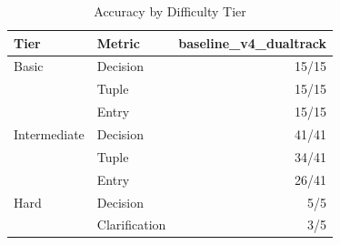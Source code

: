 \begin{table}[htbp]
\centering
\caption{Accuracy by Difficulty Tier}
\label{tab:tier-breakdown}
\begin{tabular}{ll r}
\toprule
Tier & Metric & baseline\_v4\_dualtrack \\
\midrule
  Basic & Decision & 15/15 \\
   & Tuple & 15/15 \\
   & Entry & 15/15 \\
  \midrule
  Intermediate & Decision & 41/41 \\
   & Tuple & 34/41 \\
   & Entry & 26/41 \\
  \midrule
  Hard & Decision & 5/5 \\
   & Clarification & 3/5 \\
\bottomrule
\end{tabular}
\end{table}
